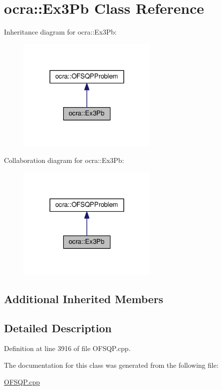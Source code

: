 \hypertarget{classocra_1_1Ex3Pb}{}\section{ocra\+:\+:Ex3\+Pb Class Reference}
\label{classocra_1_1Ex3Pb}


Inheritance diagram for ocra\+:\+:Ex3\+Pb\+:
\nopagebreak
\begin{figure}[H]
\begin{center}
\leavevmode
\includegraphics[width=192pt]{d5/d4e/classocra_1_1Ex3Pb__inherit__graph}
\end{center}
\end{figure}


Collaboration diagram for ocra\+:\+:Ex3\+Pb\+:
\nopagebreak
\begin{figure}[H]
\begin{center}
\leavevmode
\includegraphics[width=192pt]{d2/d8b/classocra_1_1Ex3Pb__coll__graph}
\end{center}
\end{figure}
\subsection*{Additional Inherited Members}


\subsection{Detailed Description}


Definition at line 3916 of file O\+F\+S\+Q\+P.\+cpp.



The documentation for this class was generated from the following file\+:\begin{DoxyCompactItemize}
\item 
\hyperlink{OFSQP_8cpp}{O\+F\+S\+Q\+P.\+cpp}\end{DoxyCompactItemize}

